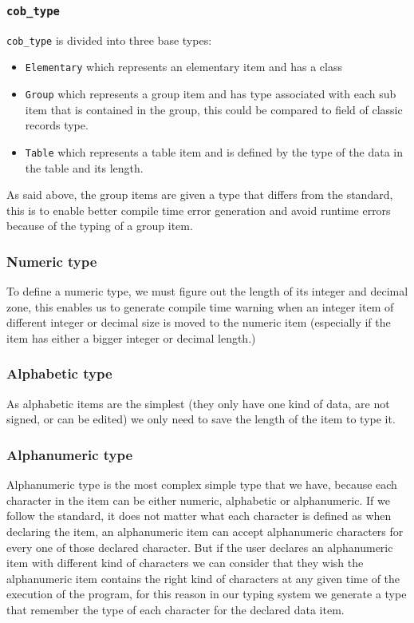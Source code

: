 \documentclass[a4paper,10pt]{article}
\newcommand{\ocamli}[1]{\texttt{#1}}
\begin{document}
\subsubsection{\ocamli{cob_type}}
\ocamli{cob_type} is divided into three base types:
\begin{itemize}
  \item \ocamli{Elementary} which represents an elementary item and has a class
  \item \ocamli{Group} which represents a group item and has type associated with each sub item
    that is contained in the group, this could be compared to field of classic records type.
  \item \ocamli{Table} which represents a table item and is defined by the type of the data in
    the table and its length.
\end{itemize}
As said above, the group items are given a type that differs from the standard, this is to enable
better compile time error generation and avoid runtime errors because of the typing of a group item.

\subsubsection{Numeric type}
To define a numeric type, we must figure out the length of its integer and decimal zone, this
enables us to generate compile time warning when an integer item of different integer or
decimal size is moved to the numeric item (especially if the item has either a bigger integer or
decimal length.)

\subsubsection{Alphabetic type}
As alphabetic items are the simplest (they only have one kind of data, are not signed, or can
be edited) we only need to save the length of the item to type it.

\subsubsection{Alphanumeric type}
Alphanumeric type is the most complex simple type that we have, because each character in the
item can be either numeric, alphabetic or alphanumeric. If we follow the standard, it
does not matter what each character is defined as when declaring the item, an alphanumeric
item can accept alphanumeric characters for every one of those declared character. But
if the user declares an alphanumeric item with different kind of characters we can consider
that they wish the alphanumeric item contains the right kind of characters at any given
time of the execution of the program, for this reason in our typing system we generate
a type that remember the type of each character for the declared data item.
\end{document}
